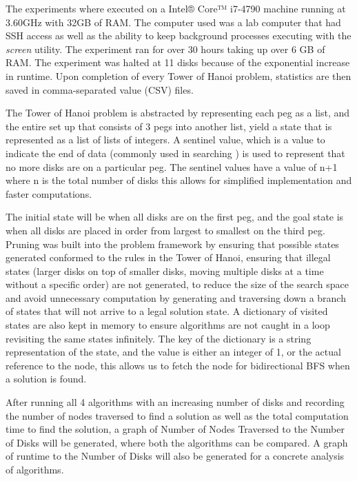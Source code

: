 \documentclass[conference]{IEEEtran}
\begin{document}
The experiments where executed on a Intel® Core™ i7-4790 machine running at 3.60GHz with 32GB of RAM. The computer used was a lab computer that had SSH access as well as the ability to keep background processes executing with the \textit{screen} utility. The experiment ran for over 30 hours taking up over 6 GB of RAM. The experiment was halted at 11 disks because of the exponential increase in runtime. Upon completion of every Tower of Hanoi problem, statistics are then saved in comma-separated value (CSV) files.

The Tower of Hanoi problem is abstracted by representing each peg as a list, and the entire set up that consists of 3 pegs into another list, yield a state that is represented as a list of lists of integers. A sentinel value, which is a value to indicate the end of data (commonly used in searching \cite{CodeComplete}) is used to represent that no more disks are on a particular peg. The sentinel values have a value of {n+1} where {n} is the total number of disks this allows for simplified implementation and faster computations.

The initial state will be when all disks are on the first peg, and the goal state is when all disks are placed in order from largest to smallest on the third peg. Pruning was built into the problem framework by ensuring that possible states generated conformed to the rules in the Tower of Hanoi, ensuring that illegal states (larger disks on top of smaller disks, moving multiple disks at a time without a specific order) are not generated, to reduce the size of the search space and avoid unnecessary computation by generating and traversing down a branch of states that will not arrive to a legal solution state. A dictionary of visited states are also kept in memory to ensure algorithms are not caught in a loop revisiting the same states infinitely. The key of the dictionary is a string representation of the state, and the value is either an integer of 1, or the actual reference to the node, this allows us to fetch the node for bidirectional BFS when a solution is found.

After running all 4 algorithms with an increasing number of disks and recording the number of nodes traversed to find a solution as well as the total computation time to find the solution, a graph of Number of Nodes Traversed to the Number of Disks will be generated, where both the algorithms can be compared. A graph of runtime to the Number of Disks will also be generated for a concrete analysis of algorithms.
\end{document}
